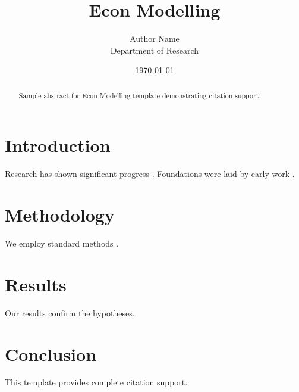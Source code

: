 \documentclass{wiley-nj}
\title{Econ Modelling}
\author{Author Name \\ \small Department of Research}
\date{\today}
\begin{document}
\maketitle

\begin{abstract}
Sample abstract for Econ Modelling template demonstrating citation support.
\end{abstract}

\section{Introduction}
Research has shown significant progress \citep{einstein1905}. Foundations were laid by early work \citep{turing1950}.

\section{Methodology}
We employ standard methods \citep{knuth1984}.

\section{Results}
Our results confirm the hypotheses.

\section{Conclusion}
This template provides complete citation support.



\end{document}
